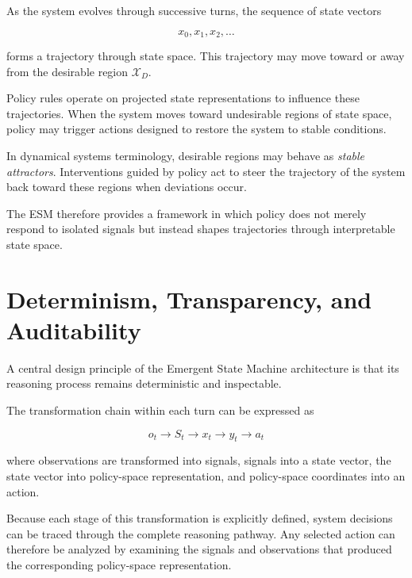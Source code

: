 \documentclass[11pt]{article}
\begin{document}
As the system evolves through successive turns, the sequence of state vectors

\begin{equation}
x_0, x_1, x_2, \dots
\end{equation}

forms a trajectory through state space. This trajectory may move toward or away from the desirable region $\mathcal{X}_D$.

Policy rules operate on projected state representations to influence these trajectories. When the system moves toward undesirable regions of state space, policy may trigger actions designed to restore the system to stable conditions.

In dynamical systems terminology, desirable regions may behave as \emph{stable attractors}. Interventions guided by policy act to steer the trajectory of the system back toward these regions when deviations occur.

The ESM therefore provides a framework in which policy does not merely respond to isolated signals but instead shapes trajectories through interpretable state space.



\section{Determinism, Transparency, and Auditability}

A central design principle of the Emergent State Machine architecture is that its reasoning process remains deterministic and inspectable.

The transformation chain within each turn can be expressed as

\begin{equation}
o_t \rightarrow S_t \rightarrow x_t \rightarrow y_t \rightarrow a_t
\end{equation}

where observations are transformed into signals, signals into a state vector, the state vector into policy-space representation, and policy-space coordinates into an action.

Because each stage of this transformation is explicitly defined, system decisions can be traced through the complete reasoning pathway. Any selected action can therefore be analyzed by examining the signals and observations that produced the corresponding policy-space representation.
\end{document}

